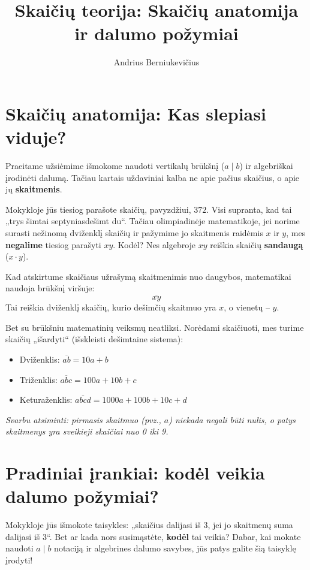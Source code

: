 \documentclass[11pt,a4paper]{scrartcl}
\title{Skaičių teorija: Skaičių anatomija ir dalumo požymiai}
\author{Andrius Berniukevičius}
\begin{document}
\maketitle

\section{Skaičių anatomija: Kas slepiasi viduje?}

Praeitame užsiėmime išmokome naudoti vertikalų brūkšnį ($a \mid b$) ir algebriškai įrodinėti dalumą. Tačiau kartais uždaviniai kalba ne apie pačius skaičius, o apie jų \textbf{skaitmenis}. 

Mokykloje jūs tiesiog parašote skaičių, pavyzdžiui, $372$. Visi supranta, kad tai „trys šimtai septyniasdešimt du“. Tačiau olimpiadinėje matematikoje, jei norime surasti nežinomą dviženklį skaičių ir pažymime jo skaitmenis raidėmis $x$ ir $y$, mes \textbf{negalime} tiesiog parašyti $xy$. Kodėl? Nes algebroje $xy$ reiškia skaičių \textbf{sandaugą} ($x \cdot y$).

Kad atskirtume skaičiaus užrašymą skaitmenimis nuo daugybos, matematikai naudoja brūkšnį viršuje:
\[ \overline{xy} \]
Tai reiškia dviženklį skaičių, kurio dešimčių skaitmuo yra $x$, o vienetų – $y$.

Bet su brūkšniu matematinių veiksmų neatliksi. Norėdami skaičiuoti, mes turime skaičių „išardyti“ (išskleisti dešimtaine sistema):
\begin{itemize}
    \item Dviženklis: $\overline{ab} = 10a + b$
    \item Triženklis: $\overline{abc} = 100a + 10b + c$
    \item Keturaženklis: $\overline{abcd} = 1000a + 100b + 10c + d$
\end{itemize}
\textit{Svarbu atsiminti: pirmasis skaitmuo (pvz., $a$) niekada negali būti nulis, o patys skaitmenys yra sveikieji skaičiai nuo 0 iki 9.}

\section{Pradiniai įrankiai: kodėl veikia dalumo požymiai?}

Mokykloje jūs išmokote taisykles: „skaičius dalijasi iš 3, jei jo skaitmenų suma dalijasi iš 3“. Bet ar kada nors susimąstėte, \textbf{kodėl} tai veikia? Dabar, kai mokate naudoti $a \mid b$ notaciją ir algebrines dalumo savybes, jūs patys galite šią taisyklę įrodyti!
\end{document}
